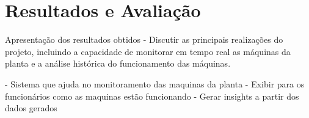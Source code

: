 \chapter{Resultados e Avaliação}\label{cap:conclusions}

Apresentação dos resultados obtidos - Discutir as principais realizações do projeto, incluindo a capacidade de monitorar em tempo real as máquinas da planta e a análise histórica do funcionamento das máquinas.

- Sistema que ajuda no monitoramento das maquinas da planta
- Exibir para os funcionários como as maquinas estão funcionando
- Gerar insights a partir dos dados gerados